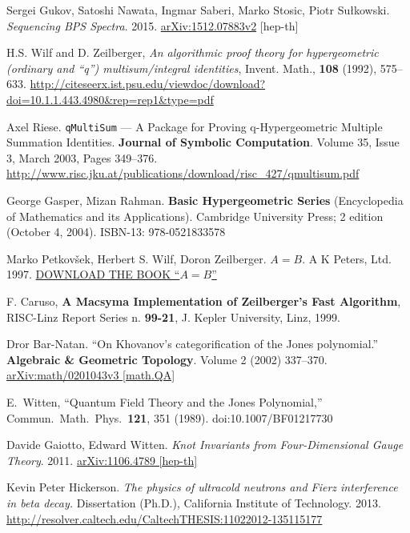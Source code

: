 \documentclass[10pt]{amsart}
\begin{document}
\begin{thebibliography}{9}
Sergei Gukov, Satoshi Nawata, Ingmar Saberi, Marko Stosic, Piotr Su\l kowski.  \emph{Sequencing BPS Spectra}.  2015.  \href{http://arxiv.org/abs/1512.07883v2}{arXiv:1512.07883v2} [hep-th]





H.S. Wilf and D. Zeilberger, \emph{An algorithmic proof theory for hypergeometric (ordinary and “q”) multisum/integral identities}, Invent. Math., \textbf{108} (1992), 575–633.  \url{http://citeseerx.ist.psu.edu/viewdoc/download?doi=10.1.1.443.4980&rep=rep1&type=pdf}

Axel Riese.  \verb|qMultiSum| — A Package for Proving q-Hypergeometric Multiple Summation Identities. \textbf{Journal of Symbolic Computation}. Volume 35, Issue 3, March 2003, Pages 349–376.  \url{http://www.risc.jku.at/publications/download/risc_427/qmultisum.pdf}

George Gasper, Mizan Rahman.  \textbf{Basic Hypergeometric Series} (Encyclopedia of Mathematics and its Applications).  Cambridge University Press; 2 edition (October 4, 2004). ISBN-13: 978-0521833578

Marko Petkov\v{s}ek, Herbert S. Wilf, Doron Zeilberger. \textbf{$A=B$}.  A K Peters, Ltd. 1997. \href{https://www.math.upenn.edu/~wilf/Downld.html}{DOWNLOAD THE BOOK ``$A=B$''}
 
F. Caruso, \textbf{A Macsyma Implementation of Zeilberger's Fast Algorithm}, RISC-Linz Report Series n. \textbf{99-21}, J. Kepler University, Linz, 1999.

Dror Bar-Natan. ``On Khovanov’s categorification of the Jones polynomial.'' \textbf{Algebraic \& Geometric Topology}.  Volume 2 (2002) 337–370.  \href{http://arxiv.org/abs/math/0201043}{arXiv:math/0201043v3 [math.QA]}

  E.~Witten,
  ``Quantum Field Theory and the Jones Polynomial,''
  Commun.\ Math.\ Phys.\  {\bf 121}, 351 (1989).
  doi:10.1007/BF01217730


Davide Gaiotto, Edward Witten. \emph{Knot Invariants from Four-Dimensional Gauge Theory}. 2011.   \href{http://arxiv.org/abs/1106.4789}{arXiv:1106.4789 [hep-th]}


Kevin Peter Hickerson.  \emph{The physics of ultracold neutrons and Fierz interference in beta decay.}  Dissertation (Ph.D.), California Institute of Technology. 2013.  \url{http://resolver.caltech.edu/CaltechTHESIS:11022012-135115177}



\end{thebibliography}
\end{document}
